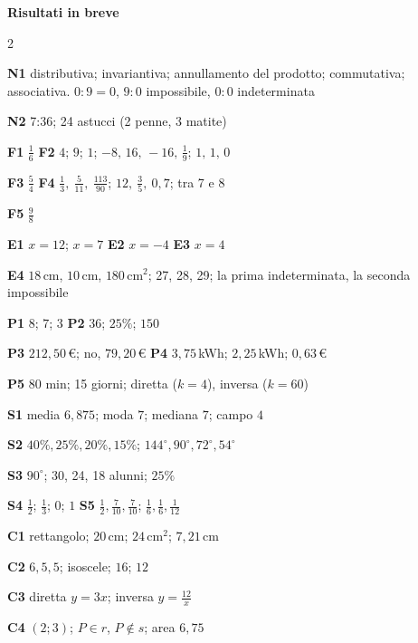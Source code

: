 \documentclass[11pt,a4paper]{article}
\newcommand{\unit}[1]{\,\mathrm{#1}}
\newcommand{\cm}{\unit{cm}}
\newcommand{\cmq}{\unit{cm^2}}
\begin{document}
\begin{center}
{\large\bfseries\color{navy} Risultati in breve}
\end{center}
\vspace{-6pt}
{\footnotesize
\setlength{\columnsep}{14pt}
\begin{multicols}{2}
\raggedright
\textbf{N1} distributiva; invariantiva; annullamento del prodotto; commutativa; associativa. $0:9=0$, $9:0$ impossibile, $0:0$ indeterminata\par
\textbf{N2} 7:36; 24 astucci (2 penne, 3 matite)\par
\textbf{F1} $\frac16$ \quad \textbf{F2} $4$; $9$; $1$; $-8,\,16,\,-16,\,\frac19$; $1,\,1,\,0$\par
\textbf{F3} $\frac54$ \quad \textbf{F4} $\frac13,\ \frac{5}{11},\ \frac{113}{90}$; $12,\ \frac35,\ 0,7$; tra 7 e 8\par
\textbf{F5} $\frac98$\par
\textbf{E1} $x=12$; $x=7$ \quad \textbf{E2} $x=-4$ \quad \textbf{E3} $x=4$\par
\textbf{E4} $18\cm$, $10\cm$, $180\cmq$; 27, 28, 29; la prima indeterminata, la seconda impossibile\par
\textbf{P1} $8$; $7$; $3$ \quad \textbf{P2} $36$; $25\%$; $150$\par
\textbf{P3} $212,50$\,€; no, $79,20$\,€ \quad \textbf{P4} $3,75$\,kWh; $2,25$\,kWh; $0,63$\,€\par
\textbf{P5} 80 min; 15 giorni; diretta ($k=4$), inversa ($k=60$)\par
\textbf{S1} media $6,875$; moda $7$; mediana $7$; campo $4$\par
\textbf{S2} $40\%,25\%,20\%,15\%$; $144^\circ,90^\circ,72^\circ,54^\circ$\par
\textbf{S3} $90^\circ$; 30, 24, 18 alunni; $25\%$\par
\textbf{S4} $\frac12$; $\frac13$; $0$; $1$ \quad \textbf{S5} $\frac12,\frac{7}{10},\frac{7}{10}$; $\frac16,\frac16,\frac{1}{12}$\par
\textbf{C1} rettangolo; $20\cm$; $24\cmq$; $7,21\cm$\par
\textbf{C2} $6,5,5$; isoscele; $16$; $12$\par
\textbf{C3} diretta $y=3x$; inversa $y=\frac{12}{x}$\par
\textbf{C4} $(2;3)$; $P\in r$, $P\notin s$; area $6,75$\par

\end{multicols}}
\end{document}
